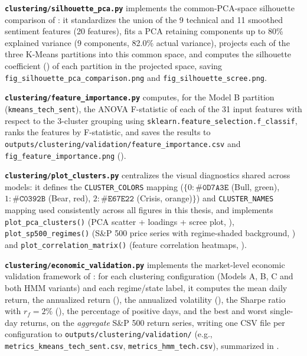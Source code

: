 \textbf{\texttt{clustering/silhouette\_pca.py}} implements the
common-PCA-space silhouette comparison of
: it standardizes the union of the 9 technical
and 11 smoothed sentiment features (20 features), fits a PCA retaining
components up to 80\% explained variance (9 components, 82.0\% actual
variance), projects each of the three K-Means partitions into this common
space, and computes the silhouette coefficient
() of each partition in the projected space, saving
\texttt{fig\_silhouette\_pca\_comparison.png} and \texttt{fig\_silhouette\_scree.png}.

\textbf{\texttt{clustering/feature\_importance.py}} computes, for the
Model B partition (\texttt{kmeans\_tech\_sent}), the ANOVA F-statistic of
each of the 31 input features with respect to the 3-cluster grouping
using \texttt{sklearn.feature\_selection.f\_classif}, ranks the features by
F-statistic, and saves the results to
\texttt{outputs/clustering/validation/feature\_importance.csv} and
\texttt{fig\_feature\_importance.png} ().

\textbf{\texttt{clustering/plot\_clusters.py}} centralizes the visual
diagnostics shared across models: it defines the
\texttt{CLUSTER\_COLORS} mapping ($\{0:\texttt{\#0D7A3E}$ (Bull, green),
$1:\texttt{\#C0392B}$ (Bear, red), $2:\texttt{\#E67E22}$ (Crisis, orange)$\}$)
and \texttt{CLUSTER\_NAMES} mapping used consistently across all figures in
this thesis, and implements \texttt{plot\_pca\_clusters()} (PCA scatter +
loadings + scree plot, ),
\texttt{plot\_sp500\_regimes()} (S\&P 500 price series with regime-shaded
background, ) and
\texttt{plot\_correlation\_matrix()} (feature correlation heatmaps,
).

\textbf{\texttt{clustering/economic\_validation.py}} implements the
market-level economic validation framework of :
for each clustering configuration (Models A, B, C and both HMM variants)
and each regime/state label, it computes the mean daily return, the
annualized return (), the annualized volatility
(), the Sharpe ratio with $r_f = 2\%$
(), the percentage of positive days, and the best and worst
single-day returns, on the \emph{aggregate} S\&P 500 return series,
writing one CSV file per configuration to
\texttt{outputs/clustering/validation/} (e.g.,
\texttt{metrics\_kmeans\_tech\_sent.csv}, \texttt{metrics\_hmm\_tech.csv}),
summarized in .


